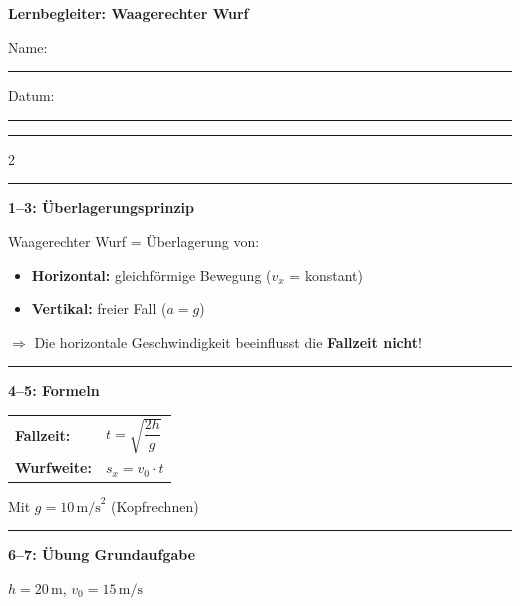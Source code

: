 \documentclass[10pt, a4paper]{article}
\newcommand{\fachfarbe}{physik}
\newcommand{\luecke}[1]{\rule[-2pt]{#1}{0.5pt}}
\newcommand{\schritt}[1]{%
    \vspace{4pt}
    \noindent\textcolor{\fachfarbe}{\rule{0.3cm}{0.3cm}}\hspace{4pt}\textbf{\textcolor{\fachfarbe}{#1}}
    \vspace{2pt}
}
\begin{document}
\begin{center}
{\Large\bfseries\textcolor{physik}{Lernbegleiter: Waagerechter Wurf}}\\[4pt]
{\small Name: \luecke{5cm} \hfill Datum: \luecke{3cm}}
\end{center}

\vspace{-2pt}
\hrule
\vspace{6pt}

\begin{multicols}{2}
\small


\schritt{1–3: Überlagerungsprinzip}

\begin{merkbox}[Merke]
Waagerechter Wurf = Überlagerung von:
\begin{itemize}[leftmargin=1em]
    \item \textbf{Horizontal:} gleichförmige Bewegung ($v_x$ = konstant)
    \item \textbf{Vertikal:} freier Fall ($a = g$)
\end{itemize}
\vspace{2pt}
$\Rightarrow$ Die horizontale Geschwindigkeit beeinflusst die \textbf{Fallzeit nicht}!
\end{merkbox}

\vspace{4pt}

\schritt{4–5: Formeln}

\begin{formelbox}
\begin{tabular}{@{}ll@{}}
\textbf{Fallzeit:} & $t = \sqrt{\dfrac{2h}{g}}$ \\[12pt]
\textbf{Wurfweite:} & $s_x = v_0 \cdot t$ \\
\end{tabular}

\vspace{4pt}
{\footnotesize Mit $g = 10\,\text{m/s}^2$ (Kopfrechnen)}
\end{formelbox}

\vspace{6pt}

\schritt{6–7: Übung Grundaufgabe}

\begin{aufgabenbox}
$h = 20\,\text{m}$, \quad $v_0 = 15\,\text{m/s}$


\end{aufgabenbox}
\end{multicols}
\end{document}
